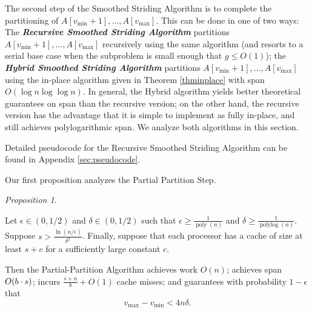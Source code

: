 \documentclass[twocolumn,10pt]{article}
\DeclarePairedDelimiter{\paren}{(}{)}
\newcommand{\poly}{\operatorname{poly}}
\newcommand{\polylog}{\operatorname{polylog}}
\newcommand{\defn}[1]{{\textit{\textbf{\boldmath #1}}}\xspace}
\renewcommand{\paragraph}[1]{\vspace{0.09in}\noindent{\bf \boldmath #1.}}
\theoremstyle{remark}
\newtheorem{proposition}[thm]{Proposition}
\theoremstyle{remark}
\begin{document}
The second step of the Smoothed Striding Algorithm is to complete the
partitioning of $A[v_{\text{min}} + 1], \ldots, A[v_{\text{max}}]$. This can be done
in one of two ways: The \defn{Recursive Smoothed Striding Algorithm}
partitions $A[v_{\text{min}} + 1], \ldots, A[v_{\text{max}}]$ recursively using the
same algorithm (and resorts to a serial base case when the subproblem
is small enough that $g \le O(1)$); the \defn{Hybrid Smoothed Striding
  Algorithm} partitions $A[v_{\text{min}} + 1], \ldots, A[v_{\text{max}}]$ using the
in-place algorithm given in Theorem \ref{thminplace} with span $O(\log
n \log \log n)$. In general, the Hybrid algorithm yields better
theoretical guarantees on span than the recursive version; on the
other hand, the recursive version has the advantage that it is
simple to implement as fully in-place, and still achieves
polylogarithmic span. We analyze both algorithms in this section.

Detailed pseudocode for the Recursive Smoothed Striding Algorithm can
be found in Appendix \ref{sec:pseudocode}.

\paragraph{Algorithm Analysis} Our first proposition analyzes the Partial Partition Step.
\begin{proposition}
  \label{prop:generalResult}
  
  Let $\epsilon \in (0, 1/2)$ and $\delta \in (0, 1/2)$ such that
  $\epsilon \ge \frac{1}{\poly(n)}$ and $\delta \ge
  \frac{1}{\polylog(n)}$. Suppose $s > \frac{\ln
    (n/\epsilon)}{\delta^2}$. Finally, suppose that each processor has
  a cache of size at least $s + c$ for a sufficiently large constant
  $c$.

  Then the Partial-Partition Algorithm achieves work $O(n)$; achieves
  span $O\paren*{b \cdot s}$; incurs $\frac{s+n}{b} + O(1)$ cache
  misses; and guarantees with probability $1 - \epsilon$ that
  $$v_{\text{max}}-v_{\text{min}} < 4 n \delta.$$
\end{proposition}
\end{document}
